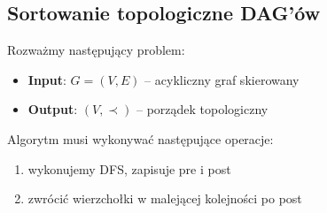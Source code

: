 \documentclass[11pt,a4paper]{article}
\begin{document}
\subsection{Sortowanie topologiczne DAG'ów}
Rozważmy następujący problem:
\begin{itemize}
    \item \textbf{Input}: $G=(V,E)$ -- acykliczny graf skierowany
    \item \textbf{Output}: $(V, \prec)$ -- porządek topologiczny
\end{itemize}
Algorytm musi wykonywać następujące operacje:
\begin{enumerate}
    \item wykonujemy DFS, zapisuje pre i post
    \item zwrócić wierzchołki w malejącej kolejności po post
\end{enumerate}
\end{document}
